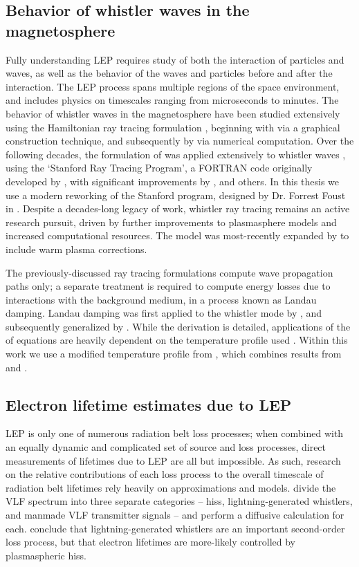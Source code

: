 \subsection{Behavior of whistler waves in the magnetosphere}
Fully understanding LEP requires study of both the interaction of particles and waves, as well as the behavior of the waves and particles before and after the interaction. The LEP process spans multiple regions of the space environment, and includes physics on timescales ranging from microseconds to minutes. The behavior of whistler waves in the magnetosphere have been studied extensively using the Hamiltonian ray tracing formulation \citep{Stix1992, Landau1975}, beginning with \cite{Haselgrove1955} via a graphical construction technique, and subsequently by \cite{Haselgrove1960} via numerical computation. Over the following decades, the formulation of \citeauthor{Haselgrove1955} was applied extensively to whistler waves \citep{Kimura1966, Edgar1972}, using the `Stanford Ray Tracing Program', a FORTRAN code originally developed by \cite{Walter1969}, with significant improvements by \cite{Inan1977b, Ngo1989}, and others. In this thesis we use a modern reworking of the Stanford program, designed by Dr. Forrest Foust in \cite{Golden2010}. Despite a decades-long legacy of work, whistler ray tracing remains an active research pursuit, driven by further improvements to plasmasphere models and increased computational resources. The \citeauthor{Golden2010} model was most-recently expanded by \cite{Maxworth2017} to include warm plasma corrections.

The previously-discussed ray tracing formulations compute wave propagation paths only; a separate treatment is required to compute energy losses due to interactions with the background medium, in a process known as Landau damping. Landau damping was first applied to the whistler mode by \cite{Kennel1966}, and subsequently generalized by \cite{Brinca1972}. While the derivation is detailed, applications of the of \citeauthor{Brinca1972} equations are heavily dependent on the temperature profile used \citep{Thorne1994, Bell2002}. Within this work we use a modified temperature profile from \cite{Golden2010}, which combines results from \cite{Bell2002} and \cite{Bortnik2007}.

\subsection{Electron lifetime estimates due to LEP}
LEP is only one of numerous radiation belt loss processes; when combined with an equally dynamic and complicated set of source and loss processes, direct measurements of lifetimes due to LEP are all but impossible. As such, research on the relative contributions of each loss process to the overall timescale of radiation belt lifetimes rely heavily on approximations and models. \cite{Abel1998} divide the VLF spectrum into three separate categories -- hiss, lightning-generated whistlers, and manmade VLF transmitter signals -- and perform a diffusive calculation for each. \citeauthor{Abel1998} conclude that lightning-generated whistlers are an important second-order loss process, but that electron lifetimes are more-likely controlled by plasmaspheric hiss.

